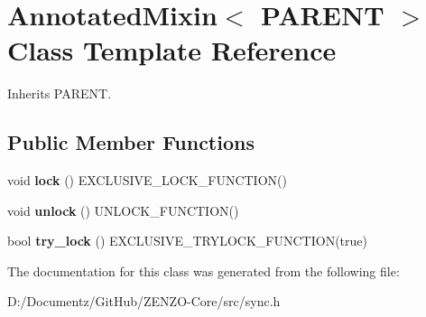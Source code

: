 \hypertarget{class_annotated_mixin}{}\section{Annotated\+Mixin$<$ P\+A\+R\+E\+NT $>$ Class Template Reference}
\label{class_annotated_mixin}


Inherits P\+A\+R\+E\+NT.

\subsection*{Public Member Functions}
\begin{DoxyCompactItemize}
\item 
\mbox{\label{class_annotated_mixin_ad1f35c6d1b8a8e980fff45e7e7cb46d3}} 
void {\bfseries lock} () E\+X\+C\+L\+U\+S\+I\+V\+E\+\_\+\+L\+O\+C\+K\+\_\+\+F\+U\+N\+C\+T\+I\+ON()
\item 
\mbox{\label{class_annotated_mixin_acc2e3da37c2d9dd483b859572e32bc24}} 
void {\bfseries unlock} () U\+N\+L\+O\+C\+K\+\_\+\+F\+U\+N\+C\+T\+I\+ON()
\item 
\mbox{\label{class_annotated_mixin_a9a33deab2da56790d8b5d30b1fd8350d}} 
bool {\bfseries try\+\_\+lock} () E\+X\+C\+L\+U\+S\+I\+V\+E\+\_\+\+T\+R\+Y\+L\+O\+C\+K\+\_\+\+F\+U\+N\+C\+T\+I\+ON(true)
\end{DoxyCompactItemize}


The documentation for this class was generated from the following file\+:\begin{DoxyCompactItemize}
\item 
D\+:/\+Documentz/\+Git\+Hub/\+Z\+E\+N\+Z\+O-\/\+Core/src/sync.\+h\end{DoxyCompactItemize}
